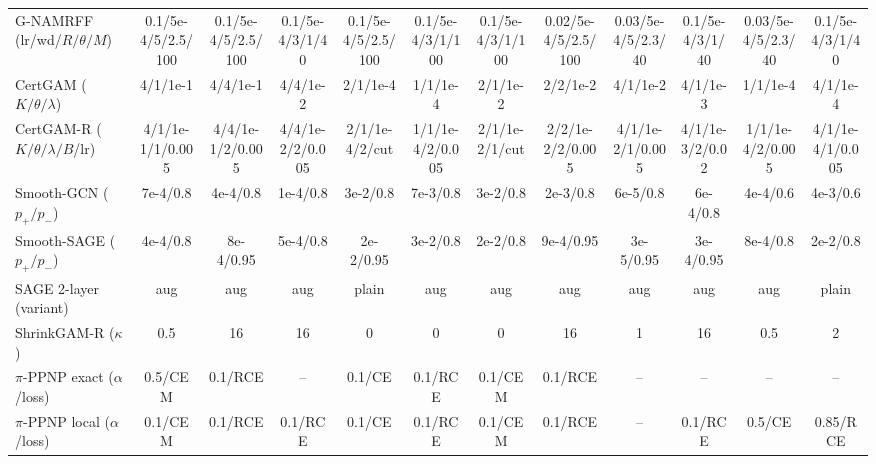 \begin{table}[!t]
{\begin{tabular}{lccccccccccc}
G-NAMRFF (lr/wd/$R/\theta/M$) & 0.1/5e-4/5/2.5/100 & 0.1/5e-4/5/2.5/100 & 0.1/5e-4/3/1/40 & 0.1/5e-4/5/2.5/100 & 0.1/5e-4/3/1/100 & 0.1/5e-4/3/1/100 & 0.02/5e-4/5/2.5/100 & 0.03/5e-4/5/2.3/40 & 0.1/5e-4/3/1/40 & 0.03/5e-4/5/2.3/40 & 0.1/5e-4/3/1/40 \\
CertGAM ($K/\theta/\lambda$) & 4/1/1e-1 & 4/4/1e-1 & 4/4/1e-2 & 2/1/1e-4 & 1/1/1e-4 & 2/1/1e-2 & 2/2/1e-2 & 4/1/1e-2 & 4/1/1e-3 & 1/1/1e-4 & 4/1/1e-4 \\
CertGAM-R ($K/\theta/\lambda/B$/lr) & 4/1/1e-1/1/0.005 & 4/4/1e-1/2/0.005 & 4/4/1e-2/2/0.005 & 2/1/1e-4/2/cut & 1/1/1e-4/2/0.005 & 2/1/1e-2/1/cut & 2/2/1e-2/2/0.005 & 4/1/1e-2/1/0.005 & 4/1/1e-3/2/0.02 & 1/1/1e-4/2/0.005 & 4/1/1e-4/1/0.005 \\
Smooth-GCN ($p_+/p_-$) & 7e-4/0.8 & 4e-4/0.8 & 1e-4/0.8 & 3e-2/0.8 & 7e-3/0.8 & 3e-2/0.8 & 2e-3/0.8 & 6e-5/0.8 & 6e-4/0.8 & 4e-4/0.6 & 4e-3/0.6 \\
Smooth-SAGE ($p_+/p_-$) & 4e-4/0.8 & 8e-4/0.95 & 5e-4/0.8 & 2e-2/0.95 & 3e-2/0.8 & 2e-2/0.8 & 9e-4/0.95 & 3e-5/0.95 & 3e-4/0.95 & 8e-4/0.8 & 2e-2/0.8 \\
SAGE 2-layer (variant) & aug & aug & aug & plain & aug & aug & aug & aug & aug & aug & plain \\
ShrinkGAM-R ($\kappa$) & 0.5 & 16 & 16 & 0 & 0 & 0 & 16 & 1 & 16 & 0.5 & 2 \\
$\pi$-PPNP exact ($\alpha$/loss) & 0.5/CEM & 0.1/RCE & -- & 0.1/CE & 0.1/RCE & 0.1/CEM & 0.1/RCE & -- & -- & -- & -- \\
$\pi$-PPNP local ($\alpha$/loss) & 0.1/CEM & 0.1/RCE & 0.1/RCE & 0.1/CE & 0.1/RCE & 0.1/CEM & 0.1/RCE & -- & 0.1/RCE & 0.5/CE & 0.85/RCE \\
\bottomrule
\end{tabular}}
\end{table}

